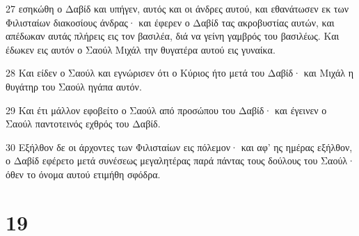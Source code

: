 \par 27 εσηκώθη ο Δαβίδ και υπήγεν, αυτός και οι άνδρες αυτού, και εθανάτωσεν εκ των Φιλισταίων διακοσίους άνδρας· και έφερεν ο Δαβίδ τας ακροβυστίας αυτών, και απέδωκαν αυτάς πλήρεις εις τον βασιλέα, διά να γείνη γαμβρός του βασιλέως. Και έδωκεν εις αυτόν ο Σαούλ Μιχάλ την θυγατέρα αυτού εις γυναίκα.
\par 28 Και είδεν ο Σαούλ και εγνώρισεν ότι ο Κύριος ήτο μετά του Δαβίδ· και Μιχάλ η θυγάτηρ του Σαούλ ηγάπα αυτόν.
\par 29 Και έτι μάλλον εφοβείτο ο Σαούλ από προσώπου του Δαβίδ· και έγεινεν ο Σαούλ παντοτεινός εχθρός του Δαβίδ.
\par 30 Εξήλθον δε οι άρχοντες των Φιλισταίων εις πόλεμον· και αφ' ης ημέρας εξήλθον, ο Δαβίδ εφέρετο μετά συνέσεως μεγαλητέρας παρά πάντας τους δούλους του Σαούλ· όθεν το όνομα αυτού ετιμήθη σφόδρα.

\chapter{19}

